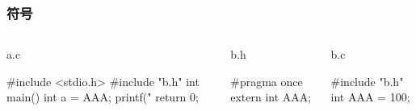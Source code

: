 \documentclass[UTF8,lualatex]{ctexbeamer}
\begin{document}
\begin{frame}[fragile,t]
    \frametitle{符号}
    \scriptsize
    \begin{columns}[t]
        \begin{column}{.3\textwidth}
            \begin{exampleblock}{a.c}
                \begin{cppcode}
                    #include <stdio.h>
                    #include "b.h"
                    int main() {
                        int a = AAA;
                        printf("%
                        return 0;
                    }
                \end{cppcode}
            \end{exampleblock}
        \end{column}
        \begin{column}{.33\textwidth}
            \begin{exampleblock}{b.h}
                \begin{cppcode}
                    #pragma once
                    extern int AAA;
                \end{cppcode}
            \end{exampleblock}
        \end{column}
        \begin{column}{.33\textwidth}
            \begin{exampleblock}{b.c}
                \begin{cppcode}
                    #include "b.h"
                    int AAA = 100;
                \end{cppcode}
            \end{exampleblock}
        \end{column}
    \end{columns}
    \begin{block}{~}
    \end{block}
\end{frame}

\end{document}
